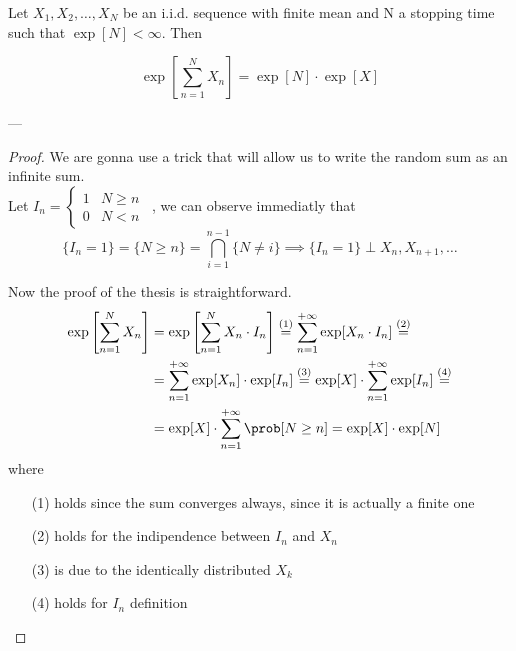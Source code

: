 \begin{theorem}
	Let $X_1, X_2, \dots, X_N $ be an i.i.d. sequence with finite mean and N a stopping time such that $\exp[N] < \infty$. Then

	\begin{equation}
		\exp\left[\sum\limits_{n=1}^N X_n \right] = \exp[N] \cdot \exp[X]
	\end{equation}
\end{theorem}
---
\begin{proof}
	We are gonna use a trick that will allow us to write the random sum as an infinite sum. \\

	Let $I_n = \begin{cases} 1 & N \ge n \\ 0 & N<n \end{cases}$~, we can observe immediatly that
	$$ \{I_n=1\} = \{N \ge n \} = \bigcap\limits_{i=1}^{n-1}\{ N \neq i \} \implies \{I_n=1\} \perp X_n, X_{n+1}, \ldots $$

	Now the proof of the thesis is straightforward.
	\begin{equation}\begin{split}
		\exp\left[\sum\limits_{n=1}^{N}X_n\right] &= \exp\left[\sum\limits_{n=1}^{N}X_n \cdot I_n \right] \stackrel{(1)}{=} \sum\limits_{n=1}^{+\infty}\exp[X_n \cdot I_n] \stackrel{(2)}{=} \\
		&=\sum\limits_{n=1}^{+\infty}\exp[X_n] \cdot \exp[I_n] \stackrel{(3)}{=} \exp[X]\cdot\sum\limits_{n=1}^{+\infty}\exp[I_n] \stackrel{(4)}{=} \\
		&= \exp[X] \cdot \sum\limits_{n=1}^{+\infty}\prob[N \ge n] = \exp[X] \cdot \exp[N]
	\end{split}\end{equation}
	where
	\begin{itemize}
		\item[(1)] holds since the sum converges always, since it is actually a finite one
		\item[(2)] holds for the indipendence between $I_n$ and $X_n$
		\item[(3)] is due to the identically distributed $X_k$
		\item[(4)] holds for $I_n$ definition
	\end{itemize}
\end{proof}

